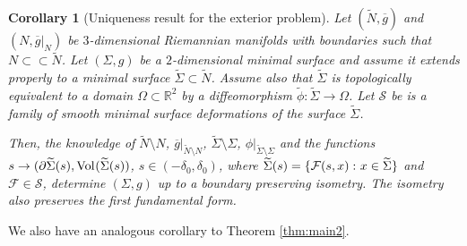\documentclass[12pt]{amsart}
\def\R{\mathbb R}
\newtheorem{corollary}[theorem]{Corollary}
\theoremstyle{definition}
\theoremstyle{remark}
\newcommand{\eps}{\epsilon}
\newcommand{\s}{\hspace{0.5pt}}
\begin{document}
\begin{corollary}[Uniqueness result for the exterior problem]\label{cor:exterior_problem_repeat}
Let $(\widetilde N,\overline g)$ and $(N, \overline g|_N)$ be $3$-dimensional Riemannian manifolds with boundaries such that $N \subset\subset \widetilde N$.
Let $(\Sigma,g)$ be a $2$-dimensional minimal surface and assume it extends properly to a minimal surface $\widetilde \Sigma \subset \widetilde N$. Assume also that $ \widetilde \Sigma$ is topologically equivalent to a domain $\Omega\subset \R^2$ by a diffeomorphism $ \widetilde \phi: \widetilde \Sigma\to \Omega$. %
Let $\mathcal S$ be  is  a family of smooth  minimal surface  deformations of the surface $\widetilde \Sigma$.


Then, the knowledge of $\widetilde N\setminus N$, $\overline g|_{\widetilde N\setminus N}$, $\widetilde \Sigma\setminus \Sigma$, $\phi|_{\widetilde \Sigma\setminus \Sigma}$ and the functions $s\to (\partial \widetilde \Sigma(s),
\hbox{Vol}\s (\widetilde \Sigma(s))$, $s\in (-\delta_0,\delta_0)$, where  $\widetilde \Sigma(s)=\{\mathcal F(s,x):\s x\in \widetilde \Sigma\}$ and
$\mathcal F \in \mathcal S$,
determine 
  $(\Sigma,g)$ up to a boundary preserving isometry. The isometry also preserves the first fundamental form.
\end{corollary}
We also have an analogous corollary to Theorem \ref{thm:main2}. 
\end{document}
